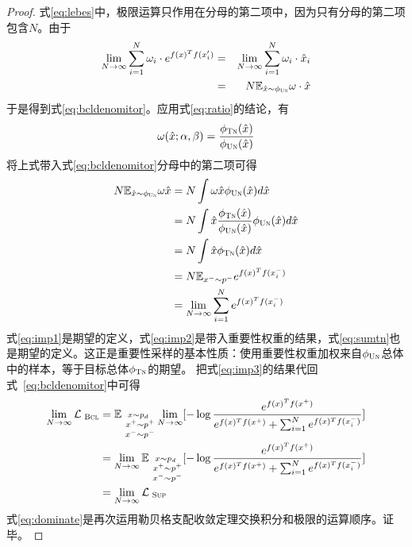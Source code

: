 \begin{theorem}[渐进无偏估计]
\begin{proof}
式\eqref{eq:lebes}中，极限运算只作用在分母的第二项中，因为只有分母的第二项包含$N$。由于
\begin{eqnarray}
\lim_{N\rightarrow \infty} \sum_{i=1}^N  \omega_i\cdot e^{f(x)^Tf(x^\prime_i)} &=& \lim_{N\rightarrow \infty} \sum_{i=1}^N  \omega_i\cdot \hat x_i \nonumber \\
&=&  N\mathbb{E}_{\hat{x} \sim \phi_{\textsc{Un}} } \omega \cdot \hat x \nonumber
\end{eqnarray}
于是得到式\eqref{eq:bcldenomitor}。应用式\eqref{eq:ratio}的结论，有
\[\omega(\hat x;\alpha, \beta) = \frac{\phi_\textsc{Tn}(\hat{x})}{\phi_{\textsc{Un}}(\hat{x})}
\]
将上式带入式\eqref{eq:bcldenomitor}分母中的第二项可得
\begin{align}
	N\mathbb{E}_ {\hat{x} \sim \phi_{\textsc{Un}}} \omega \hat{x} &= N\int \omega \hat{x}\phi_{\textsc{Un}}(\hat{x}) d\hat{x} \label{eq:imp1}\\
	&= N\int \hat{x} \frac{\phi_\textsc{Tn}(\hat{x})}{\phi_{\textsc{Un}}(\hat{x})}  \phi_{\textsc{Un}}(\hat{x}) d\hat{x} \label{eq:imp2} \\
	&= N\int  \hat{x}\phi_\textsc{Tn}(\hat{x})d\hat{x} \nonumber\\
	&= N \mathbb{E}_ {x^-\sim p^-} e^{f(x)^Tf(x_i^-)}\label{eq:sumtn}\\
	&= \lim_{N\rightarrow \infty} \sum_{i=1}^Ne^{f(x)^Tf(x_i^-)} \label{eq:imp3}
\end{align}
式\eqref{eq:imp1}是期望的定义，式\eqref{eq:imp2}是带入重要性权重的结果，式\eqref{eq:sumtn}也是期望的定义。这正是重要性采样的基本性质：使用重要性权重加权来自$\phi_{\textsc{Un}}$总体中的样本，等于目标总体$\phi_{\textsc{Tn}}$的期望。
把式\eqref{eq:imp3}的结果代回式~\eqref{eq:bcldenomitor}中可得
\begin{align}
	\lim_{N\rightarrow \infty} \mathcal{L}_\textsc{~Bcl} &=  \mathbb E_{\substack{x \sim p_d\\~x^+ \sim p^+\\~x^- \sim p^-} }	\lim_{N\rightarrow \infty}[-\log \frac{e^{f(x)^Tf(x^+)}}{e^{f(x)^Tf(x^+)} + \sum_{i=1}^Ne^{f(x)^Tf(x_i^-)}}] \nonumber\\
	&= \lim_{N\rightarrow \infty} \mathbb E_{\substack{x \sim p_d\\~x^+ \sim p^+\\~x^- \sim p^-} }	[-\log \frac{e^{f(x)^Tf(x^+)}}{e^{f(x)^Tf(x^+)} +  \sum_{i=1}^Ne^{f(x)^Tf(x_i^-)} }] \label{eq:dominate}\\
	&= \lim_{N\rightarrow \infty} \mathcal{L}_\textsc{~Sup}
\end{align}
式\eqref{eq:dominate}是再次运用勒贝格支配收敛定理\cite{tao:shi}交换积分和极限的运算顺序。证毕。
	\end{proof}
\end{theorem}

